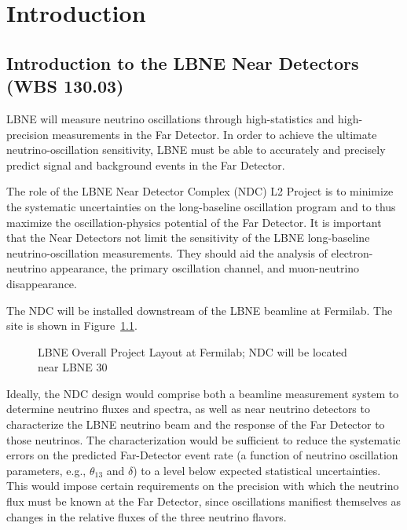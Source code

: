 \chapter{Introduction}  
\label{ch:intro}


%
\clearpage
\section{Introduction to the LBNE Near Detectors (WBS 130.03)}
\label{vol:intro}


LBNE will measure neutrino oscillations through high-statistics 
and high-precision measurements in the Far Detector. 
 In order to achieve the ultimate neutrino-oscillation sensitivity, LBNE must be able to accurately and 
precisely predict signal and background events in the Far Detector.

The role of the LBNE Near Detector Complex (NDC) L2 Project is to 
minimize the systematic uncertainties on 
the long-baseline oscillation program and to thus maximize the 
oscillation-physics potential of the Far Detector. It is important that the
 Near Detectors not limit the sensitivity of the 
LBNE long-baseline neutrino-oscillation measurements. 
They should aid the analysis of electron-neutrino 
appearance, the primary oscillation channel, and muon-neutrino disappearance. 

The NDC will be installed downstream of the LBNE beamline at Fermilab. The site is shown in Figure~\ref{fig:nscf_layout-v3}.

\begin{figure}[htbp]
\centering
\caption{LBNE Overall Project Layout at Fermilab; NDC will be located near LBNE 30}
\label{fig:nscf_layout-v3}
\end{figure}


Ideally, the NDC design would comprise both a beamline measurement system to determine neutrino fluxes and spectra, as well as near neutrino detectors to characterize the LBNE neutrino beam and
the response of the Far Detector to those neutrinos.  The characterization would be sufficient to reduce the systematic errors
on the predicted Far-Detector event rate (a function of neutrino oscillation 
parameters, e.g., $\theta_{13}$ and $\delta$) to a level below expected statistical uncertainties.
This would impose certain requirements on
the precision with which the neutrino flux must be known at the Far Detector, since
oscillations manifiest themselves as changes in the relative fluxes of the three neutrino
flavors.

